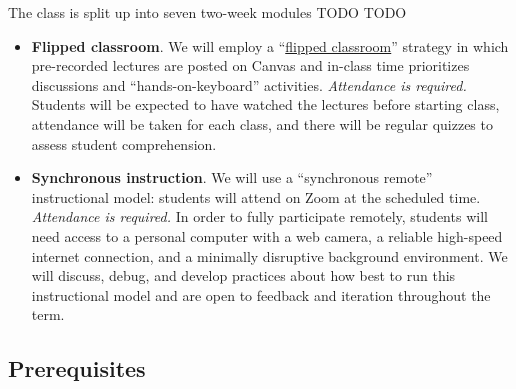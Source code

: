 \documentclass[10pt]{memoir}
\begin{document}
The class is split up into seven two-week modules TODO TODO


\begin{itemize}[itemsep=0pt,leftmargin=1em]
    
    \item \textbf{Flipped classroom}. We will employ a ``\href{https://en.wikipedia.org/wiki/Flipped_classroom}{flipped classroom}'' strategy in which pre-recorded lectures are posted on Canvas and in-class time prioritizes discussions and ``hands-on-keyboard'' activities. \textit{Attendance is required.} Students will be expected to have watched the lectures before starting class, attendance will be taken for each class, and there will be regular quizzes to assess student comprehension.
    
    
    \item \textbf{Synchronous instruction}. 
    We will use a ``synchronous remote'' instructional model: students will attend on Zoom at the scheduled time. \textit{Attendance is required.} In order to fully participate remotely, students will need access to a personal computer with a web camera, a reliable high-speed internet connection, and a minimally disruptive background environment. We will discuss, debug, and develop practices about how best to run this instructional model and are open to feedback and iteration throughout the term. %
  
\end{itemize}

\subsection{Prerequisites}
\end{document}
